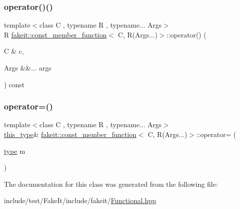 \mbox{\label{classfakeit_1_1const__member__function_3_01C_00_01R_07Args_8_8_8_08_4_a196473c6962a3a57b4226b26a18d0be3}} 
\subsubsection{\texorpdfstring{operator()()}{operator()()}}
{\footnotesize\ttfamily template$<$class C , typename R , typename... Args$>$ \\
R \mbox{\hyperlink{classfakeit_1_1const__member__function}{fakeit\+::const\+\_\+member\+\_\+function}}$<$ C, R(Args...)$>$\+::operator() (\begin{DoxyParamCaption}\item[{C \&}]{c,  }\item[{Args \&\&...}]{args }\end{DoxyParamCaption}) const\hspace{0.3cm}{\ttfamily [inline]}}

\mbox{\label{classfakeit_1_1const__member__function_3_01C_00_01R_07Args_8_8_8_08_4_afbe2aca06ddad27395006ac3fbad95e3}} 
\subsubsection{\texorpdfstring{operator=()}{operator=()}}
{\footnotesize\ttfamily template$<$class C , typename R , typename... Args$>$ \\
\mbox{\hyperlink{classfakeit_1_1const__member__function_3_01C_00_01R_07Args_8_8_8_08_4_af7e34265af3f3daedfe6c23d7cd2f36f}{this\+\_\+type}}\& \mbox{\hyperlink{classfakeit_1_1const__member__function}{fakeit\+::const\+\_\+member\+\_\+function}}$<$ C, R(Args...)$>$\+::operator= (\begin{DoxyParamCaption}\item[{\mbox{\hyperlink{classfakeit_1_1const__member__function_3_01C_00_01R_07Args_8_8_8_08_4_ab962f803e5a8b5b2078ee8674900288c}{type}}}]{m }\end{DoxyParamCaption})\hspace{0.3cm}{\ttfamily [inline]}}



The documentation for this class was generated from the following file\+:\begin{DoxyCompactItemize}
\item 
include/test/\+Fake\+It/include/fakeit/\mbox{\hyperlink{Functional_8hpp}{Functional.\+hpp}}\end{DoxyCompactItemize}
